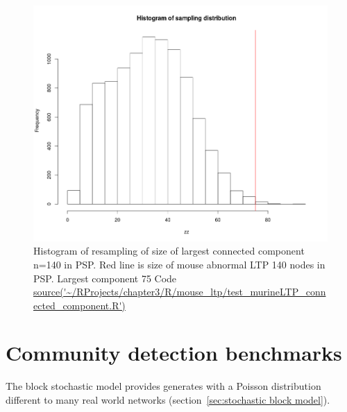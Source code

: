 \begin{figure}
    \centering
    \includegraphics[width=\textwidth]{images/chapter3/connected_components/Rplot_mouse_abnormal_ltp_histogram_MP0002207.png}
    \caption{Histogram of resampling of size of largest connected component n=140 in PSP. Red line is size of mouse abnormal LTP 140 nodes in PSP. Largest component 75 Code\url{ source('~/RProjects/chapter3/R/mouse_ltp/test_murineLTP_connected_component.R')}}
    \label{fig:histogram mouse ltp}
\end{figure}


\section{Community detection benchmarks}

The block stochastic model provides generates with a Poisson distribution different to many real world networks (section~\ref{sec:stochastic block model}).

